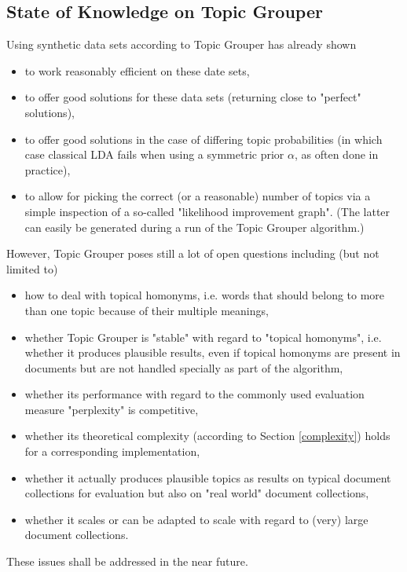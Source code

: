 \documentclass[10pt, a4paper, oneside]{article}
\begin{document}
\subsection{State of Knowledge on Topic Grouper}

Using synthetic data sets according to \cite{Tan_topic-weak-correlatedlatent} Topic Grouper has already shown
\begin{itemize}
\item to work reasonably efficient on these date sets,
\item to offer good solutions for these data sets (returning close to "perfect" solutions),
\item to offer good solutions in the case of differing topic probabilities (in which case classical LDA fails when using a symmetric prior $\alpha$, as often done in practice),
\item to allow for picking the correct (or a reasonable) number of topics via a simple inspection of a so-called "likelihood improvement graph". (The latter can easily be generated during a run of the Topic Grouper algorithm.)
\end{itemize}

However, Topic Grouper poses still a lot of open questions including (but not limited to)
\begin{itemize}
\item how to deal with topical homonyms, i.e. words that should belong to more than one topic because of their multiple meanings,
\item whether Topic Grouper is "stable" with regard to "topical homonyms", i.e. whether it produces plausible results, even if topical homonyms are present in documents but are not handled specially as part of the algorithm,
\item whether its performance with regard to the commonly used evaluation measure "perplexity" is competitive,
\item whether its theoretical complexity (according to Section \ref{complexity}) holds for a corresponding implementation,
\item whether it actually produces plausible topics as results on typical document collections for evaluation but also on "real world" document collections,
\item whether it scales or can be adapted to scale with regard to (very) large document collections.
\end{itemize}
These issues shall be addressed in the near future.
\end{document}
